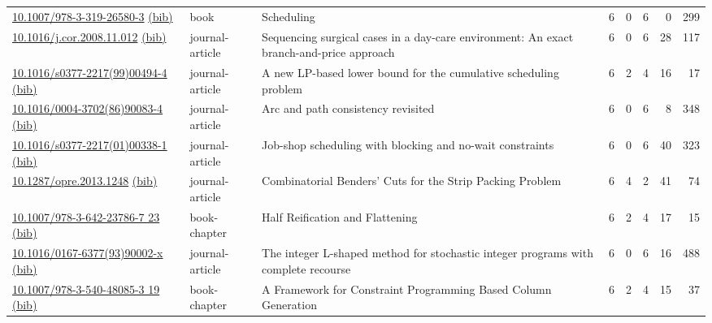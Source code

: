{\begin{longtable}{p{5cm}lp{11cm}rrrrr}
\href{http://dx.doi.org/10.1007/978-3-319-26580-3}{10.1007/978-3-319-26580-3} \href{https://www.doi2bib.org/bib/10.1007/978-3-319-26580-3}{(bib)} & book & Scheduling & 6 & 0 & 6 & 0 & 299 \\
\href{http://dx.doi.org/10.1016/j.cor.2008.11.012}{10.1016/j.cor.2008.11.012} \href{https://www.doi2bib.org/bib/10.1016/j.cor.2008.11.012}{(bib)} & journal-article & Sequencing surgical cases in a day-care environment: An exact branch-and-price approach & 6 & 0 & 6 & 28 & 117 \\
\href{http://dx.doi.org/10.1016/s0377-2217(99)00494-4}{10.1016/s0377-2217(99)00494-4} \href{https://www.doi2bib.org/bib/10.1016/s0377-2217(99)00494-4}{(bib)} & journal-article & A new LP-based lower bound for the cumulative scheduling problem & 6 & 2 & 4 & 16 & 17 \\
\href{http://dx.doi.org/10.1016/0004-3702(86)90083-4}{10.1016/0004-3702(86)90083-4} \href{https://www.doi2bib.org/bib/10.1016/0004-3702(86)90083-4}{(bib)} & journal-article & Arc and path consistency revisited & 6 & 0 & 6 & 8 & 348 \\
\href{http://dx.doi.org/10.1016/s0377-2217(01)00338-1}{10.1016/s0377-2217(01)00338-1} \href{https://www.doi2bib.org/bib/10.1016/s0377-2217(01)00338-1}{(bib)} & journal-article & Job-shop scheduling with blocking and no-wait constraints & 6 & 0 & 6 & 40 & 323 \\
\href{http://dx.doi.org/10.1287/opre.2013.1248}{10.1287/opre.2013.1248} \href{https://www.doi2bib.org/bib/10.1287/opre.2013.1248}{(bib)} & journal-article & Combinatorial Benders' Cuts for the Strip Packing Problem & 6 & 4 & 2 & 41 & 74 \\
\href{http://dx.doi.org/10.1007/978-3-642-23786-7_23}{10.1007/978-3-642-23786-7 23} \href{https://www.doi2bib.org/bib/10.1007/978-3-642-23786-7_23}{(bib)} & book-chapter & Half Reification and Flattening & 6 & 2 & 4 & 17 & 15 \\
\href{http://dx.doi.org/10.1016/0167-6377(93)90002-x}{10.1016/0167-6377(93)90002-x} \href{https://www.doi2bib.org/bib/10.1016/0167-6377(93)90002-x}{(bib)} & journal-article & The integer L-shaped method for stochastic integer programs with complete recourse & 6 & 0 & 6 & 16 & 488 \\
\href{http://dx.doi.org/10.1007/978-3-540-48085-3_19}{10.1007/978-3-540-48085-3 19} \href{https://www.doi2bib.org/bib/10.1007/978-3-540-48085-3_19}{(bib)} & book-chapter & A Framework for Constraint Programming Based Column Generation & 6 & 2 & 4 & 15 & 37 \\

\end{longtable}}
